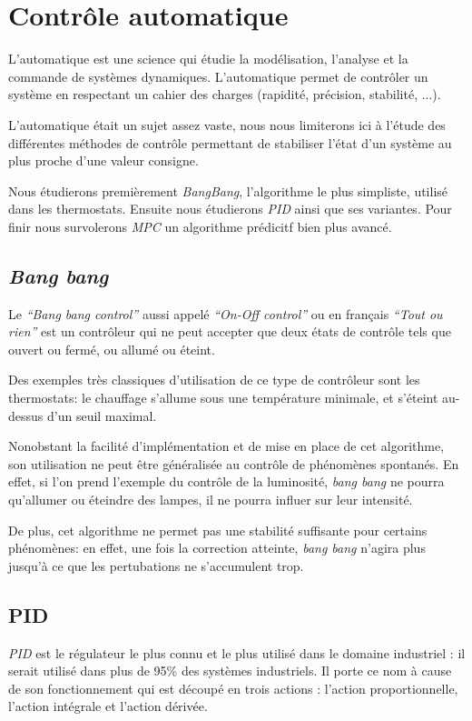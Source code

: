 \documentclass[a4paper,10pt]{report}
\begin{document}
\section{Contrôle automatique}
L’automatique est une science qui étudie la modélisation, l’analyse et la commande de systèmes dynamiques.
L’automatique permet de contrôler un système en respectant un cahier des charges (rapidité, précision, stabilité, ...).

L'automatique était un sujet assez vaste, nous nous limiterons ici à l'étude des différentes méthodes de contrôle permettant de stabiliser l'état d'un système au plus proche d'une valeur consigne.

Nous étudierons premièrement \emph{BangBang}, l'algorithme le plus simpliste, utilisé dans les thermostats.
Ensuite nous étudierons \emph{PID} ainsi que ses variantes.
Pour finir nous survolerons \emph{MPC} un algorithme prédicitf bien plus avancé.

\subsection{\emph{Bang bang}}
Le \emph{``Bang bang control''} aussi appelé \emph{``On-Off control''} ou en français \emph{``Tout ou rien''} est un contrôleur qui ne peut accepter que deux états de contrôle tels que ouvert ou fermé, ou allumé ou éteint.

Des exemples très classiques d'utilisation de ce type de contrôleur sont les thermostats: le chauffage s'allume sous une température minimale, et s'éteint au-dessus d'un seuil maximal.

Nonobstant la facilité d'implémentation et de mise en place de cet algorithme, son utilisation ne peut être généralisée au contrôle de phénomènes spontanés. En effet, si l'on prend l'exemple du contrôle de la luminosité, \emph{bang bang} ne pourra qu'allumer ou éteindre des lampes, il ne pourra influer sur leur intensité. \cite{Burghes2004245}

De plus, cet algorithme ne permet pas une stabilité suffisante pour certains phénomènes: en effet, une fois la correction atteinte, \emph{bang bang} n'agira plus jusqu'à ce que les pertubations ne s'accumulent trop. \cite{Burghes2004245}


\subsection{PID}
\label{PID}

\emph{PID} est le régulateur le plus connu et le plus utilisé dans le domaine industriel : il serait utilisé dans plus de 95\% des systèmes industriels. \cite{Kinnaert2013, Astrom2002}
Il porte ce nom à cause de son fonctionnement qui est découpé en trois actions : l'action proportionnelle, l'action intégrale et l'action dérivée.
\end{document}
